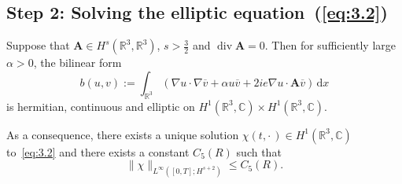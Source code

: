 \documentclass[AHL,Unicode,longabstracts]{cedram}
\newcommand{\BA}{\mathbf{A}}
\newcommand{\R}{\mathbb{R}}
\newcommand{\Com}{\mathbb{C}}
\DeclareMathOperator{\Div}{div}
\newcommand*{\dd}{\mathrm{d}}
\newcommand*{\dx}{\dd x}
\begin{document}
\subsection*{Step 2: Solving the elliptic equation~(\ref{eq:3.2})}

\begin{lemm}\label{elliptic2}
Suppose that $\BA \in H^s(\R^3,\R^3)$, $s > \frac{3}{2}$ and $\Div \BA=0$. Then for sufficiently large $\alpha>0$, the bilinear form
\[
b(u,v) := \int_{\R^3} (\nabla u \cdot \nabla \overline{v}
+\alpha u\overline{v}+ 2ie \nabla u\cdot \BA \overline{v}) \,\dx
\]
is hermitian, continuous and elliptic on $H^1(\R^3,\Com)\times H^1(\R^3,\Com)$.

As a consequence, there exists a unique solution $\chi(t,{\cdot\,}) \in H^1(\R^3,\Com)$ to~\eqref{eq:3.2} and there exists a constant $C_5(R)$ such that
\[
\|\chi \|_{L^\infty([0,T];H^{s+2})}\leq C_5(R).
\]
\end{lemm}
\end{document}
